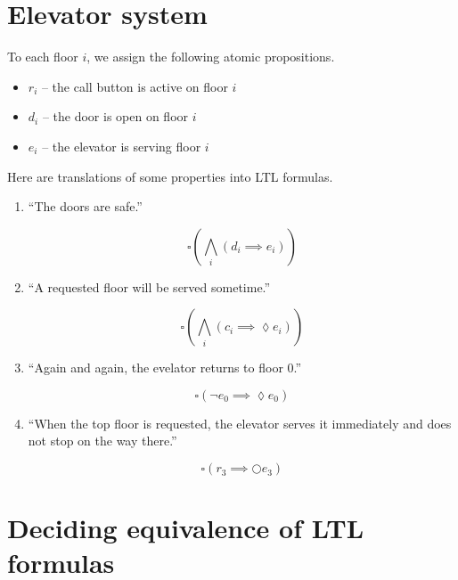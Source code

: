 \documentclass[letterpaper,11pt]{article}
\newcommand{\question}{\section}
\newcommand{\eventually}{\lozenge}
\newcommand{\always}{\square}
\newcommand{\step}{\bigcirc}
\newcommand{\Land}{\bigwedge}
\newcommand{\parens}[1]{\left(#1\right)}
\begin{document}
\question{Elevator system}

To each floor $i$, we assign the following atomic propositions.
\begin{itemize}
    \item $r_i$ -- the call button is active on floor $i$
    \item $d_i$ -- the door is open on floor $i$
    \item $e_i$ -- the elevator is serving floor $i$
\end{itemize}

Here are translations of some properties into LTL formulas.

\begin{enumerate}
    \item ``The doors are safe.''

        \begin{equation*}
            \always\parens{\Land_i \parens{d_i \implies e_i}}
        \end{equation*}

    \item ``A requested floor will be served sometime.''

        \begin{equation*}
            \always\parens{
                \Land_i \parens{
                    c_i \implies \eventually e_i
                }
            }
        \end{equation*}

    \item ``Again and again, the evelator returns to floor 0.''

        \begin{equation*}
            \always\parens{
                \neg e_0 \implies \eventually e_0
            }
        \end{equation*}

    \item ``When the top floor is requested, the elevator serves it immediately
        and does not stop on the way there.''

        \begin{equation*}
            \always\parens{r_3 \implies \step e_3}
        \end{equation*}
\end{enumerate}

\question{Deciding equivalence of LTL formulas}
\end{document}
